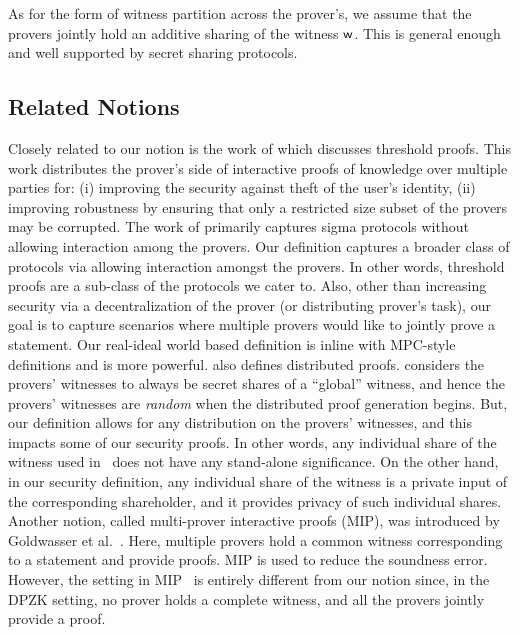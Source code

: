 As for the form of witness partition across the prover's, we assume that the provers jointly hold an additive sharing of the witness $\mathsf{w}$. This is general enough and well supported by secret sharing protocols.

\subsection{Related Notions}\label{subsec:related_notion}
Closely related to our notion is the work of \cite{EfficientTZ} which discusses threshold proofs. This work distributes the prover's side of interactive proofs of knowledge over multiple parties for: (i) improving the security against theft of the user's identity, (ii) improving robustness by ensuring that only a restricted size subset of the provers may be corrupted. The work of \cite{EfficientTZ} primarily captures sigma protocols without allowing interaction among the provers. Our definition captures a broader class of protocols via allowing interaction amongst the provers.  In other words, threshold proofs are a sub-class of the protocols we cater to. Also, other than increasing security via a decentralization of the prover (or distributing prover's task), our goal is to capture scenarios where multiple provers would like to jointly prove a statement.  Our real-ideal world based definition is inline with MPC-style definitions and is more powerful. \cite{Ped92} also defines distributed proofs. \cite{Ped92} considers the provers' witnesses to always be secret shares of a ``global'' witness, and hence the provers' witnesses are \textit{random} when the distributed proof generation begins. But, our definition allows for any distribution on the provers' witnesses, and this impacts some of our security proofs. 
In other words, any individual share of the witness used in~\cite{Ped92} does not have any stand-alone significance. On the other hand, in our security definition, any individual share of the witness is a private input of the corresponding shareholder, and it provides privacy of such individual shares.
Another notion, called multi-prover interactive proofs (MIP), was introduced by Goldwasser et al.~\cite{ben2019multi}. Here, multiple provers hold a common witness corresponding to a statement and provide proofs. MIP is used to reduce the soundness error. However, the setting in MIP~\cite{ben2019multi, blumberg2014} is entirely different from our notion since, in the DPZK setting, no prover holds a complete witness, and all the provers jointly provide a proof.
